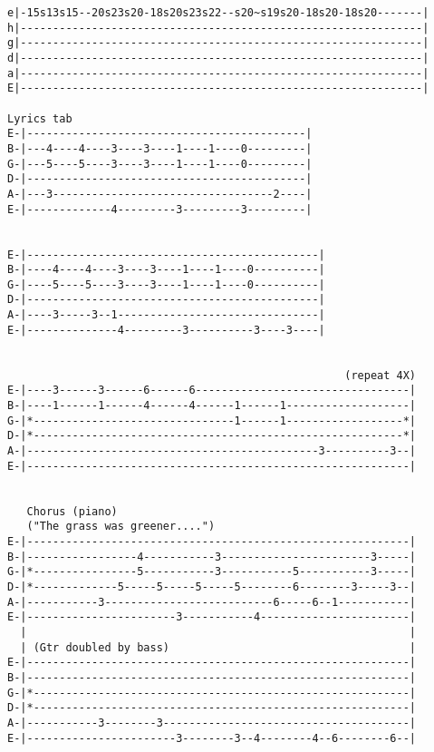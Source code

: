 \begin{verbatim}
e|-15s13s15--20s23s20-18s20s23s22--s20~s19s20-18s20-18s20-------|
h|--------------------------------------------------------------|
g|--------------------------------------------------------------|
d|--------------------------------------------------------------|
a|--------------------------------------------------------------|
E|--------------------------------------------------------------|

Lyrics tab
E-|-------------------------------------------|
B-|---4----4----3----3----1----1----0---------|
G-|---5----5----3----3----1----1----0---------|
D-|-------------------------------------------|
A-|---3----------------------------------2----|
E-|-------------4---------3---------3---------|


E-|---------------------------------------------|
B-|----4----4----3----3----1----1----0----------|
G-|----5----5----3----3----1----1----0----------|
D-|---------------------------------------------|
A-|----3-----3--1-------------------------------|
E-|--------------4---------3----------3----3----|


                                                    (repeat 4X)
E-|----3------3------6------6---------------------------------|
B-|----1------1------4------4------1------1-------------------|
G-|*-------------------------------1------1------------------*|
D-|*---------------------------------------------------------*|
A-|---------------------------------------------3----------3--|
E-|-----------------------------------------------------------|


   Chorus (piano)
   ("The grass was greener....")
E-|-----------------------------------------------------------|
B-|-----------------4-----------3-----------------------3-----|
G-|*----------------5-----------3-----------5-----------3-----|
D-|*-------------5-----5-----5-----5--------6--------3-----3--|
A-|-----------3--------------------------6-----6--1-----------|
E-|-----------------------3-----------4-----------------------|
  |                                                           |
  | (Gtr doubled by bass)                                     |
E-|-----------------------------------------------------------|
B-|-----------------------------------------------------------|
G-|*----------------------------------------------------------|
D-|*----------------------------------------------------------|
A-|-----------3--------3--------------------------------------|
E-|-----------------------3--------3--4--------4--6--------6--|



\end{verbatim}
